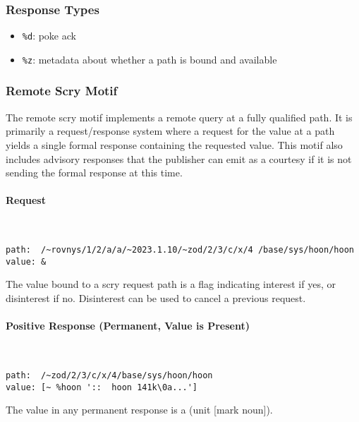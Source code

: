 \documentclass[twoside]{article}
\begin{document}
\subsubsection{Response Types}

\begin{itemize}
  \item  \lstinline[style=inlinecode]{%d}: poke ack
  \item  \lstinline[style=inlinecode]{%z}: metadata about whether a path is bound and available
\end{itemize}

\subsubsection{Remote Scry Motif}

The remote scry motif implements a remote query at a fully qualified path. It is primarily a request/response system where a request for the value at a path yields a single formal response containing the requested value. This motif also includes advisory responses that the publisher can emit as a courtesy if it is not sending the formal response at this time.

\paragraph{Request} \mbox{}\\

\begin{lstlisting}[style=listingcode]
path:  /~rovnys/1/2/a/a/~2023.1.10/~zod/2/3/c/x/4 /base/sys/hoon/hoon
value: &
\end{lstlisting}

The value bound to a scry request path is a flag indicating interest if yes, or disinterest if no. Disinterest can be used to cancel a previous request.

\paragraph{Positive Response (Permanent, Value is Present)} \mbox{}\\

\begin{lstlisting}[style=listingcode]
path:  /~zod/2/3/c/x/4/base/sys/hoon/hoon
value: [~ %hoon '::  hoon 141k\0a...']
\end{lstlisting}

The value in any permanent response is a (unit [mark noun]).
\end{document}

